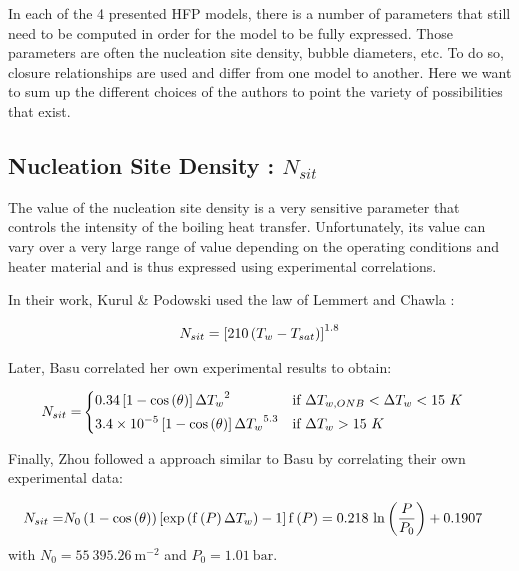 In each of the 4 presented HFP models, there is a number of parameters that still need to be computed in order for the model to be fully expressed. Those parameters are often the nucleation site density, bubble diameters, etc. To do so, closure relationships are used and differ from one model to another. Here we want to sum up the different choices of the authors to point the variety of possibilities that exist.

\subsection{Nucleation Site Density : $N_{sit}$}

The value of the nucleation site density is a very sensitive parameter that controls the intensity of the boiling heat transfer. Unfortunately, its value can vary over a very large range of value depending on the operating conditions and heater material and is thus expressed using experimental correlations.

\npar
In their work, Kurul \& Podowski used the law of Lemmert and Chawla \cite{lemmert}:

\begin{align}
N_{sit}=\left[ 210\left( T_{w}-T_{sat} \right) \right]^{1.8}
\end{align}


\npar
Later, Basu \cite{basu} correlated her own experimental results to obtain:

\begin{align}
N_{sit}=&
\begin{dcases}
0.34\left[ 1-\mathrm{cos}\left( \theta \right) \right] {\Delta T_{w}}^{2} & \text{if } \Delta T_{w,ONB}<\Delta T_{w} < 15\ K\\
3.4\times 10^{-5}\left[ 1-\mathrm{cos}\left( \theta \right) \right] {\Delta T_{w}}^{5.3} & \text{if } \Delta T_{w} > 15\ K
\end{dcases}
\end{align}

\npar

\npar
Finally, Zhou \etal followed a approach similar to Basu \etal by correlating their own experimental data:

\begin{align}
N_{sit} =& N_{0}\left( 1-\mathrm{cos}\left( \theta \right) \right)\left[ \mathrm{exp}\left( \mathrm{f}\left( P \right) \Delta T_{w}  \right) -1  \right]
\mathrm{f}\left( P \right) = 0.218~\mathrm{ln}\left( \dfrac{P}{P_{0}} \right)+0.1907
\end{align}
with $N_{0}=55~395.26\ \mathrm{m}^{-2}$ and $P_{0}=1.01\ \mathrm{bar}$.



